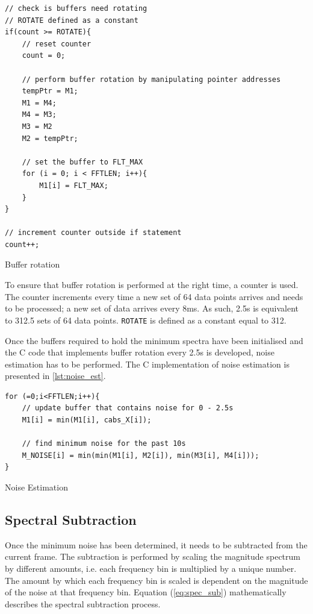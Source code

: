 \documentclass[a4paper,pra,twocolumn,10pt,aps,longbibliography,nobalancelastpage]{revtex4-1}
\begin{document}
\begin{listing}[H]
\begin{verbatim}
// check is buffers need rotating
// ROTATE defined as a constant
if(count >= ROTATE){
    // reset counter
    count = 0;

    // perform buffer rotation by manipulating pointer addresses
    tempPtr = M1;
    M1 = M4;
    M4 = M3;
    M3 = M2
    M2 = tempPtr;
    
    // set the buffer to FLT_MAX
    for (i = 0; i < FFTLEN; i++){
        M1[i] = FLT_MAX;
    }
}

// increment counter outside if statement
count++;
\end{verbatim}
\caption{Buffer rotation} 
\label{lst:buff_rot}
\end{listing}

To ensure that buffer rotation is performed at the right time, a counter is used. The counter increments every time a new set of 64 data points arrives and needs to be processed; a new set of data arrives every 8ms. As such, 2.5s is equivalent to 312.5 sets of 64 data points. {\tt ROTATE} is defined as a constant equal to 312. 

Once the buffers required to hold the minimum spectra have been initialised and the C code that implements buffer rotation every 2.5s is developed, noise estimation has to be performed. The C implementation of noise estimation is presented in \ref{lst:noise_est}.

\begin{listing}
\begin{verbatim}
for (=0;i<FFTLEN;i++){
    // update buffer that contains noise for 0 - 2.5s
    M1[i] = min(M1[i], cabs_X[i]);
    
    // find minimum noise for the past 10s		
    M_NOISE[i] = min(min(M1[i], M2[i]), min(M3[i], M4[i]));
}
\end{verbatim}
\caption{Noise Estimation} 
\label{lst:noise_est}
\end{listing}

\subsection{Spectral Subtraction}
Once the minimum noise has been determined, it needs to be subtracted from the current frame. The subtraction is performed by scaling the magnitude spectrum by different amounts, i.e. each frequency bin is multiplied by a unique number. The amount by which each frequency bin is scaled is dependent on the magnitude of the noise at that frequency bin. Equation (\ref{eq:spec_sub}) mathematically describes the spectral subtraction process.
\end{document}
